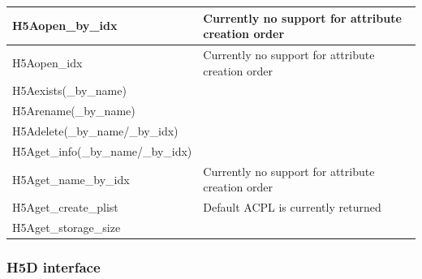 \documentclass[12pt]{article}
\begin{document}
\begin{center}
\begin{tabularx}{\linewidth}{| X | X |}
H5Aopen\_by\_idx & Currently no support for attribute creation order \\ \hline
H5Aopen\_idx & Currently no support for attribute creation order \\ \hline
H5Aexists(\_by\_name) & \\ \hline
H5Arename(\_by\_name) & \\ \hline
H5Adelete(\_by\_name/\_by\_idx) & \\ \hline
H5Aget\_info(\_by\_name/\_by\_idx) & \\ \hline
H5Aget\_name\_by\_idx & Currently no support for attribute creation order \\ \hline
H5Aget\_create\_plist & Default ACPL is currently returned \\ \hline
H5Aget\_storage\_size & \\ \hline

\end{tabularx}

\end{center}

\subsubsection{H5D interface}
\end{document}
